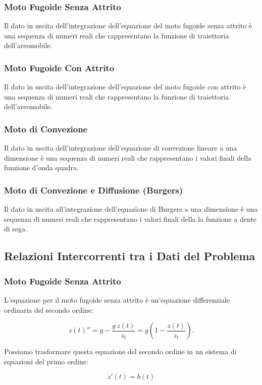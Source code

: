 \subsubsection*{Moto Fugoide Senza Attrito}
Il dato in uscita dell'integrazione dell'equazione del moto fugoide senza attrito è una sequenza di numeri reali che rappresentano la funzione di traiettoria dell'areomobile.
\subsubsection*{Moto Fugoide Con Attrito}
Il dato in uscita dell'integrazione dell'equazione del moto fugoide con attrito è una sequenza di numeri reali che rappresentano la funzione di traiettoria dell'areomobile.
\subsubsection*{Moto di Convezione}
Il dato in uscita dell'integrazione dell'equazione di convezione lineare a una dimensione è una sequenza di numeri reali che rappresentano i valori finali della funzione d'onda quadra.
\subsubsection*{Moto di Convezione e Diffusione (Burgers)}
Il dato in uscita all'integrazione dell'equazione di Burgers a una dimensione è una sequenza di numeri reali che rappresentano i valori finali della la funzione a dente di sega.

\subsection{Relazioni Intercorrenti tra i Dati del Problema}\label{analisi}

\subsubsection*{Moto Fugoide Senza Attrito}
L’equazione per il moto fugoide senza attrito è un’equazione differenziale ordinaria del secondo ordine:

\begin{equation}
z(t)'' = g - \frac{g \,z(t)}{z_t} = g \left(1 - \frac{z(t)}{z_t}\right).
\end{equation}

\noindent
Possiamo trasformare questa equazione del secondo ordine in un sistema di equazioni del primo ordine:

\begin{equation}
z'(t) = b(t)
\end{equation}

